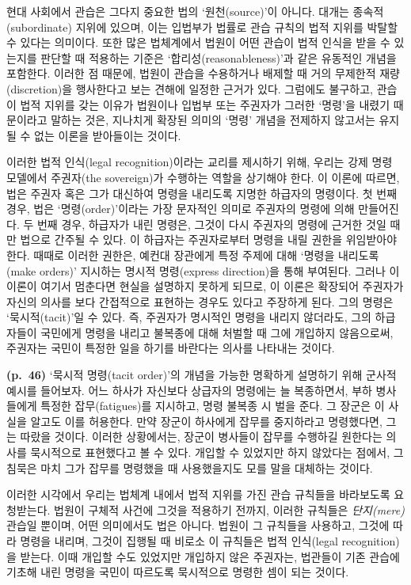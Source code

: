 \documentclass[12pt, oneside]{book}  %
\begin{document}
현대 사회에서 관습은 그다지 중요한 법의 `원천(source)'이 아니다. 대개는
종속적(subordinate) 지위에 있으며, 이는 입법부가 법률로 관습 규칙의 법적
지위를 박탈할 수 있다는 의미이다. 또한 많은 법체계에서 법원이 어떤
관습이 법적 인식을 받을 수 있는지를 판단할 때 적용하는 기준은
`합리성(reasonableness)'과 같은 유동적인 개념을 포함한다. 이러한 점
때문에, 법원이 관습을 수용하거나 배제할 때 거의 무제한적
재량(discretion)을 행사한다고 보는 견해에 일정한 근거가 있다. 그럼에도
불구하고, 관습이 법적 지위를 갖는 이유가 법원이나 입법부 또는 주권자가
그러한 `명령'을 내렸기 때문이라고 말하는 것은, 지나치게 확장된 의미의
`명령' 개념을 전제하지 않고서는 유지될 수 없는 이론을 받아들이는 것이다.

이러한 법적 인식(legal recognition)이라는 교리를 제시하기 위해, 우리는
강제 명령 모델에서 주권자(the sovereign)가 수행하는 역할을 상기해야
한다. 이 이론에 따르면, 법은 주권자 혹은 그가 대신하여 명령을 내리도록
지명한 하급자의 명령이다. 첫 번째 경우, 법은 `명령(order)'이라는 가장
문자적인 의미로 주권자의 명령에 의해 만들어진다. 두 번째 경우, 하급자가
내린 명령은, 그것이 다시 주권자의 명령에 근거한 것일 때만 법으로 간주될
수 있다. 이 하급자는 주권자로부터 명령을 내릴 권한을 위임받아야 한다.
때때로 이러한 권한은, 예컨대 장관에게 특정 주제에 대해 `명령을
내리도록(make orders)' 지시하는 명시적 명령(express direction)을 통해
부여된다. 그러나 이 이론이 여기서 멈춘다면 현실을 설명하지 못하게
되므로, 이 이론은 확장되어 주권자가 자신의 의사를 보다 간접적으로
표현하는 경우도 있다고 주장하게 된다. 그의 명령은 `묵시적(tacit)'일 수
있다. 즉, 주권자가 명시적인 명령을 내리지 않더라도, 그의 하급자들이
국민에게 명령을 내리고 불복종에 대해 처벌할 때 그에 개입하지 않음으로써,
주권자는 국민이 특정한 일을 하기를 바란다는 의사를 나타내는 것이다.

\textbf{(p.~46)} `묵시적 명령(tacit order)'의 개념을 가능한 명확하게
설명하기 위해 군사적 예시를 들어보자. 어느 하사가 자신보다 상급자의
명령에는 늘 복종하면서, 부하 병사들에게 특정한 잡무(fatigues)를
지시하고, 명령 불복종 시 벌을 준다. 그 장군은 이 사실을 알고도 이를
허용한다. 만약 장군이 하사에게 잡무를 중지하라고 명령했다면, 그는 따랐을
것이다. 이러한 상황에서는, 장군이 병사들이 잡무를 수행하길 원한다는
의사를 묵시적으로 표현했다고 볼 수 있다. 개입할 수 있었지만 하지
않았다는 점에서, 그 침묵은 마치 그가 잡무를 명령했을 때 사용했을지도
모를 말을 대체하는 것이다.

이러한 시각에서 우리는 법체계 내에서 법적 지위를 가진 관습 규칙들을
바라보도록 요청받는다. 법원이 구체적 사건에 그것을 적용하기 전까지,
이러한 규칙들은 \emph{단지(mere)} 관습일 뿐이며, 어떤 의미에서도 법은
아니다. 법원이 그 규칙들을 사용하고, 그것에 따라 명령을 내리며, 그것이
집행될 때 비로소 이 규칙들은 법적 인식(legal recognition)을 받는다. 이때
개입할 수도 있었지만 개입하지 않은 주권자는, 법관들이 기존 관습에 기초해
내린 명령을 국민이 따르도록 묵시적으로 명령한 셈이 되는 것이다.
\end{document}
